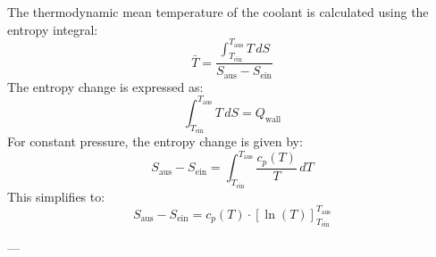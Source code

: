 The thermodynamic mean temperature of the coolant is calculated using the entropy integral:  
\[
\bar{T} = \frac{\int_{T_{\text{ein}}}^{T_{\text{aus}}} T \, dS}{S_{\text{aus}} - S_{\text{ein}}}
\]  
The entropy change is expressed as:  
\[
\int_{T_{\text{ein}}}^{T_{\text{aus}}} T \, dS = Q_{\text{wall}}
\]  
For constant pressure, the entropy change is given by:  
\[
S_{\text{aus}} - S_{\text{ein}} = \int_{T_{\text{ein}}}^{T_{\text{aus}}} \frac{c_p(T)}{T} \, dT
\]  
This simplifies to:  
\[
S_{\text{aus}} - S_{\text{ein}} = c_p(T) \cdot \left[\ln(T)\right]_{T_{\text{ein}}}^{T_{\text{aus}}}
\]  

---